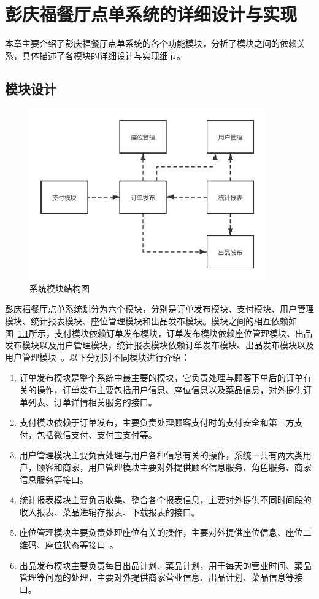 \chapter{彭庆福餐厅点单系统的详细设计与实现}
本章主要介绍了彭庆福餐厅点单系统的各个功能模块，分析了模块之间的依赖关系，具体描述了各模块的详细设计与实现细节。
\section{模块设计}
\begin{figure}[htbp!]
    \centering
    \includegraphics[width=4in]{FIGs/chapter4/model.pdf}
    \caption{系统模块结构图}\label{fig_model}
\end{figure}

彭庆福餐厅点单系统划分为六个模块，分别是订单发布模块、支付模块、用户管理模块、统计报表模块、座位管理模块和出品发布模块。模块之间的相互依赖如图~\ref{fig_model}所示，支付模块依赖订单发布模块，订单发布模块依赖座位管理模块、出品发布模块以及用户管理模块，统计报表模块依赖订单发布模块、出品发布模块以及用户管理模块~\cite{sjb2019}。以下分别对不同模块进行介绍：

\begin{enumerate}
    \item 订单发布模块是整个系统中最主要的模块，它负责处理与顾客下单后的订单有关的操作，订单发布主要包括用户信息、座位信息以及菜品信息，对外提供订单列表、订单详情相关服务的接口。
    \item 支付模块依赖于订单发布，主要负责处理顾客支付时的支付安全和第三方支付，包括微信支付、支付宝支付等。
    \item 用户管理模块主要负责处理与用户各种信息有关的操作，系统一共有两大类用户，顾客和商家，用户管理模块主要对外提供顾客信息服务、角色服务、商家信息服务等接口。
    \item 统计报表模块主要负责收集、整合各个报表信息，主要对外提供不同时间段的收入报表、菜品进销存报表、下载报表的接口。
    \item 座位管理模块主要负责处理座位有关的操作，主要对外提供座位信息、座位二维码、座位状态等接口~\cite{dj2019}。
    \item 出品发布模块主要负责每日出品计划、菜品计划，用于每天的营业时间、菜品管理等问题的处理，主要对外提供商家营业信息、出品计划、菜品信息等接口。
\end{enumerate}

